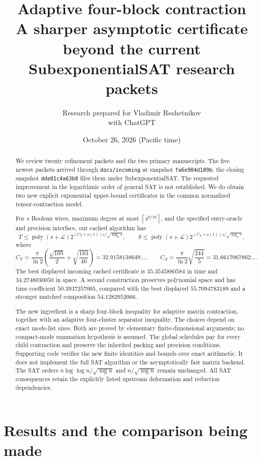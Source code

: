 \documentclass[11pt,letterpaper]{article}
\title{\textbf{Adaptive four-block contraction}\\[4pt]
\large A sharper asymptotic certificate beyond the current\\SubexponentialSAT research packets}
\author{Research prepared for Vladimir Reshetnikov\\with ChatGPT}
\date{October 26, 2026 (Pacific time)}
\theoremstyle{remark}\newtheorem{remark}[theorem]{Remark}
\newcommand{\poly}{\operatorname{poly}}
\newcommand{\ceil}[1]{\left\lceil#1\right\rceil}
\begin{document}
\maketitle
\begin{abstract}
We review twenty refinement packets and the two primary manuscripts.
The five newest packets arrived through \texttt{docs/incoming} at snapshot
\texttt{fa6e904d109b}; the closing snapshot \texttt{dde01c4a63b8}
files them under SubexponentialSAT. The requested improvement in the logarithmic order of
general SAT is not established. We do obtain two new explicit exponential
upper-bound certificates in the common normalized tensor-contraction model.

For $s$ Boolean wires, maximum degree at most $\ceil{s^{9/10}}$, and the
specified entry-oracle and precision interface, our cached algorithm has
\[
 T\le\poly(s+\mathcal L)2^{(C_T+o(1))s/\sqrt{\log_2s}},\qquad
 S\le\poly(s+\mathcal L)2^{(C_S+o(1))s/\sqrt{\log_2s}},
\]
where
\[
 C_T=\frac\pi{\ln2}\left(\frac{\sqrt{105}}2+\sqrt{\frac{183}{40}}\right)
 =32.9158138649\ldots,\qquad
 C_S=\frac\pi{\ln2}\sqrt{\frac{244}{5}}=31.6617067862\ldots .
\]
The best displayed incoming cached certificate is $35.3545880584$ in time
and $34.2748030050$ in space. A second construction preserves polynomial
space and has time coefficient $50.3937257005$, compared with the best
displayed $55.7094783189$ and a stronger matched composition $54.1282952066$.

The new ingredient is a sharp four-block inequality for adaptive matrix
contraction, together with an adaptive four-cluster separator inequality.
The choices depend on exact mode-list sizes. Both are proved by elementary
finite-dimensional arguments; no compact-mode summation hypothesis is
assumed. The global schedules pay for every child contraction and preserve
the inherited packing and precision conditions. Supporting code verifies
the new finite identities and bounds over exact arithmetic. It does not
implement the full SAT algorithm or the asymptotically fast matrix backend.
The SAT orders $n\log\log n/\sqrt{\log n}$ and $n/\sqrt{\log n}$ remain
unchanged. All SAT consequences retain the explicitly listed upstream
deformation and reduction dependencies.
\end{abstract}
\clearpage
{\setlength{\parskip}{0pt}\tableofcontents}
\clearpage

\section{Results and the comparison being made}
\label{sec:results}
\end{document}
